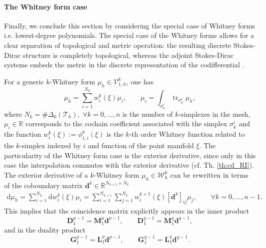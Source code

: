 \documentclass{elsarticle}
\renewcommand\d{\ensuremath{\mathrm{d}}}
\newcommand{\bbR}{\mathbb{R}}
\DeclareMathOperator{\tr}{tr}
\begin{document}
\paragraph{The Whitney form case}
Finally, we conclude this section by considering the special case of Whitney forms i.e. lowest-degree polynomials. The special case of the Whitney forms allows for a clear separation of topological and metric operation: the resulting discrete Stokes-Dirac structure is completely topological, whereas the adjoint Stokes-Dirac systems embeds the metric in the discrete representation of the codifferential \cite{bochev2006}.
 
For a generic $k$-Whitney form $\mu_h \in \mathcal{V}_{1, h}^k$, one has 
\begin{equation}\label{eq:whitney_basis}
    \mu_h = \sum_{i=1}^{N_{k}} w_i^{k}(\xi) \mu_i, \qquad \mu_i = \int_{\sigma_k^i} \tr_{\sigma_k^i} \mu_h, 
\end{equation}
where $N_k = \# \Delta_{k}(\mathcal{T}_h), \; \forall k=0, \dots, n$ is the number of $k$-simplexes in the mesh, $\mu_i\in \bbR$ corresponds to the cochain coefficient associated with the simplex $\sigma_k^i$ and the function $w_i^{k}(\xi):= \phi_{1, i}^k(\xi)$ is the $k$-th order Whitney function related to the $k$-simplex indexed by $i$ and function of the point manifold $\xi$. The particularity of the Whitney form case is the exterior derivative, since only in this case the interpolation commutes with the exterior derivative (cf. Th. \ref{th:cd_RI}). The exterior derivative of a $k$-Whitney form $\mu_h \in \mathcal{W}_h^k$ can be rewritten in terms of the coboundary matrix $\mathbf{d}^k \in \mathbb{R}^{N_{k+1}\times N_k}$
\begin{equation}\label{eq:alg_d}
\begin{aligned}
    \d \mu_h = \sum_{i=1}^{N_k} \d w_i^{k}(\xi) \mu_i = \sum_{i=1}^{N_{k+1}} \sum_{j=1}^{N_{k}} w_i^{k+1}(\xi) [\mathbf{d}^{k}]_{ij} \mu_j, \qquad \forall k = 0, \dots, n-1.
\end{aligned}
\end{equation}
This implies that the coincidence matrix explicitly appears in the inner product
\begin{equation}\label{eq:alg_d_inner_W}
    \mathbf{D}_1^{p-1} = \mathbf{M}^p_1 \mathbf{d}^{p-1}, \qquad
    \mathbf{D}_1^{q-1} = \mathbf{M}^q_1 \mathbf{d}^{q-1}, 
\end{equation}
and in the duality product
\begin{equation}\label{eq:alg_d_dualpr_W}
    \mathbf{G}_1^{p-1} = \mathbf{L}^p_1 \mathbf{d}^{p-1}, \qquad
    \mathbf{G}_1^{q-1} = \mathbf{L}^q_1 \mathbf{d}^{q-1}. 
\end{equation}
\end{document}
